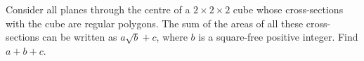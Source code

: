 Consider all planes through the centre of a $2\times2\times2$ cube whose cross-sections with the cube are regular polygons. The sum of the areas of all these cross-sections can be written as $a\sqrt b+c$, where $b$ is a square-free positive integer. Find $a+b+c$.
